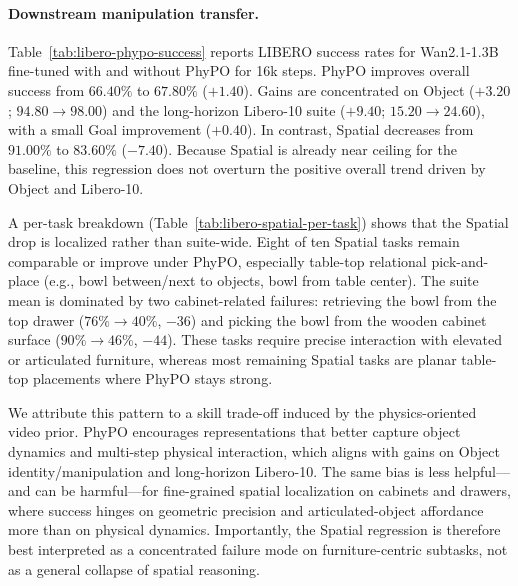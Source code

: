 \documentclass{article}
\begin{document}
\paragraph{Downstream manipulation transfer.}
Table~\ref{tab:libero-phypo-success} reports LIBERO success rates for
Wan2.1-1.3B fine-tuned with and without PhyPO for 16k steps.
PhyPO improves overall success from $66.40\%$ to $67.80\%$ ($+1.40$).
Gains are concentrated on Object ($+3.20$; $94.80{\rightarrow}98.00$) and the
long-horizon Libero-10 suite ($+9.40$; $15.20{\rightarrow}24.60$), with a small
Goal improvement ($+0.40$).
In contrast, Spatial decreases from $91.00\%$ to $83.60\%$ ($-7.40$).
Because Spatial is already near ceiling for the baseline, this regression does
not overturn the positive overall trend driven by Object and Libero-10.

A per-task breakdown (Table~\ref{tab:libero-spatial-per-task}) shows that the
Spatial drop is localized rather than suite-wide.
Eight of ten Spatial tasks remain comparable or improve under PhyPO, especially
table-top relational pick-and-place (e.g., bowl between/next to objects, bowl
from table center).
The suite mean is dominated by two cabinet-related failures: retrieving the
bowl from the top drawer ($76\%{\rightarrow}40\%$, $-36$) and picking the bowl
from the wooden cabinet surface ($90\%{\rightarrow}46\%$, $-44$).
These tasks require precise interaction with elevated or articulated furniture,
whereas most remaining Spatial tasks are planar table-top placements where
PhyPO stays strong.

We attribute this pattern to a skill trade-off induced by the physics-oriented
video prior.
PhyPO encourages representations that better capture object dynamics and
multi-step physical interaction, which aligns with gains on Object
identity/manipulation and long-horizon Libero-10.
The same bias is less helpful---and can be harmful---for fine-grained spatial
localization on cabinets and drawers, where success hinges on geometric
precision and articulated-object affordance more than on physical dynamics.
Importantly, the Spatial regression is therefore best interpreted as a
concentrated failure mode on furniture-centric subtasks, not as a general
collapse of spatial reasoning.
\end{document}
